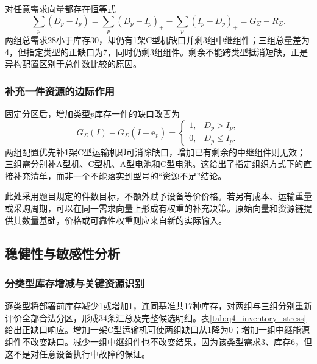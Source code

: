 \documentclass[withoutpreface,colorprint]{format}
\numberwithin{equation}{section}
\numberwithin{figure}{section}
\numberwithin{table}{section}
\begin{document}
对任意需求向量都存在恒等式
\begin{equation}
 \sum_p(D_p-I_p)=\sum_p(D_p-I_p)_+-\sum_p(I_p-D_p)_+=G_\Sigma-R_\Sigma.
 \label{eq:q4_gap_balance}
\end{equation}
两组总需求28小于库存30，却仍有1架C型机缺口并剩3组中继组件；三组总量差为4，但指定类型的正缺口为7，同时仍剩3组组件。剩余不能跨类型抵消短缺，正是异构配置区别于总件数比较的原因。

\subsubsection{补充一件资源的边际作用}
固定分区后，增加类型$p$库存一件的缺口改善为
\begin{equation}
 G_\Sigma(I)-G_\Sigma(I+\boldsymbol e_p)=
 \begin{cases}1,&D_p>I_p,\\0,&D_p\le I_p.\end{cases}
 \label{eq:q4_marginal_stock}
\end{equation}
两组配置优先补1架C型运输机即可消除缺口，增加已有剩余的中继组件则无效；三组需分别补A型机、C型机、A型电池和C型电池。这给出了指定组织方式下的直接补充清单，而非一个不能落实到型号的“资源不足”结论。

此处采用题目规定的件数目标，不额外赋予设备等价价格。若另有成本、运输重量或采购周期，可以在同一需求向量上形成有权重的补充决策。原始向量和资源链提供其数量基础，价格或可靠性权重则应来自新的实际输入。


\subsection{稳健性与敏感性分析}
\label{sec:q4_robust}
\subsubsection{分类型库存增减与关键资源识别}
逐类型将部署前库存减少1或增加1，连同基准共17种库存，对两组与三组分别重新评价全部合法分区，形成34条汇总及完整候选明细。表\ref{tab:q4_inventory_stress}给出正缺口响应。增加一架C型运输机可使两组缺口从1降为0；增加一组中继能源组件不改变缺口。减少一组中继组件也不改变结果，因为该类型需求3、库存6，但这不是对任意设备执行中故障的保证。
\end{document}
